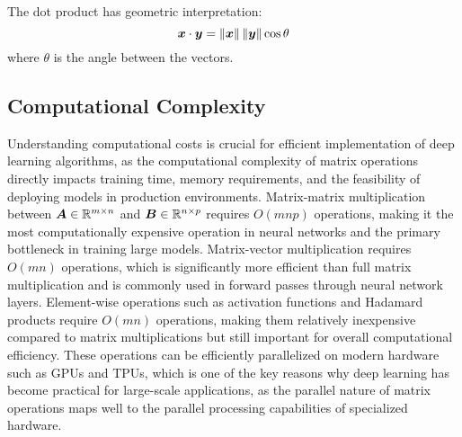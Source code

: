 The dot product has geometric interpretation:
\begin{equation}
    \boldsymbol{x} \cdot \boldsymbol{y} = \left\lVert\boldsymbol{x}\right\rVert \left\lVert\boldsymbol{y}\right\rVert \cos\theta
\end{equation}
where $\theta$ is the angle between the vectors.

\subsection{Computational Complexity}

Understanding computational costs is crucial for efficient implementation of deep learning algorithms, as the computational complexity of matrix operations directly impacts training time, memory requirements, and the feasibility of deploying models in production environments. Matrix-matrix multiplication between $\boldsymbol{A} \in \mathbb{R}^{m \times n}$ and $\boldsymbol{B} \in \mathbb{R}^{n \times p}$ requires $O(mnp)$ operations, making it the most computationally expensive operation in neural networks and the primary bottleneck in training large models. Matrix-vector multiplication requires $O(mn)$ operations, which is significantly more efficient than full matrix multiplication and is commonly used in forward passes through neural network layers. Element-wise operations such as activation functions and Hadamard products require $O(mn)$ operations, making them relatively inexpensive compared to matrix multiplications but still important for overall computational efficiency. These operations can be efficiently parallelized on modern hardware such as GPUs and TPUs, which is one of the key reasons why deep learning has become practical for large-scale applications, as the parallel nature of matrix operations maps well to the parallel processing capabilities of specialized hardware.
